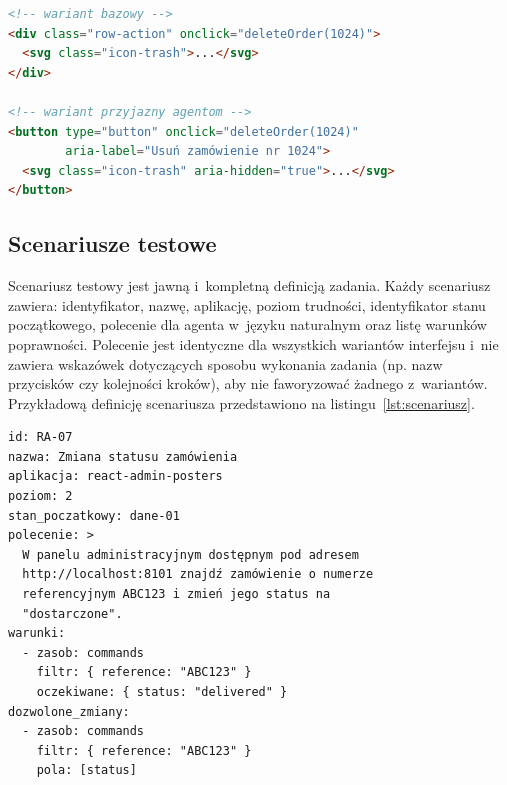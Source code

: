 \begin{lstlisting}[language=HTML, caption={Przycisk usuwania w~wariancie bazowym (u~góry) i~w~wariancie przyjaznym agentom (u~dołu)}, label=lst:wariant, basicstyle=\ttfamily\footnotesize]
<!-- wariant bazowy -->
<div class="row-action" onclick="deleteOrder(1024)">
  <svg class="icon-trash">...</svg>
</div>

<!-- wariant przyjazny agentom -->
<button type="button" onclick="deleteOrder(1024)"
        aria-label="Usuń zamówienie nr 1024">
  <svg class="icon-trash" aria-hidden="true">...</svg>
</button>
\end{lstlisting}

\subsection{Scenariusze testowe}
\label{sec:scenariusze}
Scenariusz testowy jest jawną i~kompletną definicją zadania. Każdy scenariusz zawiera: identyfikator, nazwę, aplikację, poziom trudności, identyfikator stanu początkowego, polecenie dla agenta w~języku naturalnym oraz listę warunków poprawności. Polecenie jest identyczne dla wszystkich wariantów interfejsu i~nie zawiera wskazówek dotyczących sposobu wykonania zadania (np. nazw przycisków czy kolejności kroków), aby nie faworyzować żadnego z~wariantów. Przykładową definicję scenariusza przedstawiono na listingu~\ref{lst:scenariusz}.

\begin{lstlisting}[language={}, caption={Przykładowa definicja scenariusza testowego}, label=lst:scenariusz, basicstyle=\ttfamily\footnotesize]
id: RA-07
nazwa: Zmiana statusu zamówienia
aplikacja: react-admin-posters
poziom: 2
stan_poczatkowy: dane-01
polecenie: >
  W panelu administracyjnym dostępnym pod adresem
  http://localhost:8101 znajdź zamówienie o numerze
  referencyjnym ABC123 i zmień jego status na
  "dostarczone".
warunki:
  - zasob: commands
    filtr: { reference: "ABC123" }
    oczekiwane: { status: "delivered" }
dozwolone_zmiany:
  - zasob: commands
    filtr: { reference: "ABC123" }
    pola: [status]
\end{lstlisting}

